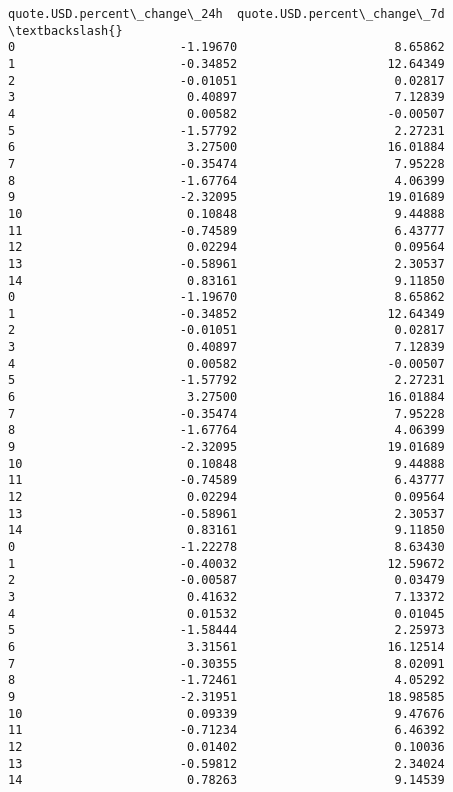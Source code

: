 \documentclass[11pt]{article}
\begin{document}
\begin{tcolorbox}[breakable, size=fbox, boxrule=.5pt, pad at break*=1mm, opacityfill=0]
\begin{Verbatim}[commandchars=\\\{\}]
    quote.USD.percent\_change\_24h  quote.USD.percent\_change\_7d  \textbackslash{}
0                       -1.19670                      8.65862
1                       -0.34852                     12.64349
2                       -0.01051                      0.02817
3                        0.40897                      7.12839
4                        0.00582                     -0.00507
5                       -1.57792                      2.27231
6                        3.27500                     16.01884
7                       -0.35474                      7.95228
8                       -1.67764                      4.06399
9                       -2.32095                     19.01689
10                       0.10848                      9.44888
11                      -0.74589                      6.43777
12                       0.02294                      0.09564
13                      -0.58961                      2.30537
14                       0.83161                      9.11850
0                       -1.19670                      8.65862
1                       -0.34852                     12.64349
2                       -0.01051                      0.02817
3                        0.40897                      7.12839
4                        0.00582                     -0.00507
5                       -1.57792                      2.27231
6                        3.27500                     16.01884
7                       -0.35474                      7.95228
8                       -1.67764                      4.06399
9                       -2.32095                     19.01689
10                       0.10848                      9.44888
11                      -0.74589                      6.43777
12                       0.02294                      0.09564
13                      -0.58961                      2.30537
14                       0.83161                      9.11850
0                       -1.22278                      8.63430
1                       -0.40032                     12.59672
2                       -0.00587                      0.03479
3                        0.41632                      7.13372
4                        0.01532                      0.01045
5                       -1.58444                      2.25973
6                        3.31561                     16.12514
7                       -0.30355                      8.02091
8                       -1.72461                      4.05292
9                       -2.31951                     18.98585
10                       0.09339                      9.47676
11                      -0.71234                      6.46392
12                       0.01402                      0.10036
13                      -0.59812                      2.34024
14                       0.78263                      9.14539


\end{Verbatim}
\end{tcolorbox}
\end{document}
